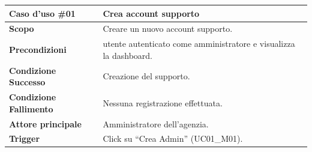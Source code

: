 \documentclass{article}
\begin{document}
\newpage
\begin{table}[htbp]
\centering
\renewcommand{\arraystretch}{1.5}
\begin{tabular}{|p{3cm}|l|p{4.5cm}|p{4.5cm}|}
\hline
\rowcolor[HTML]{010066} 
{\color[HTML]{EFEFEF} \textbf{Caso d'uso \#01}} & \multicolumn{3}{l|}{\color[HTML]{FFFFFF} \textbf{Crea account supporto}} \\ \hline

\textbf{Scopo} & \multicolumn{3}{l|}{Creare un nuovo account supporto.} \\ \hline

\textbf{Precondizioni} & \multicolumn{3}{l|}{utente autenticato come amministratore e visualizza la dashboard.} \\ \hline

\textbf{Condizione Successo} & \multicolumn{3}{l|}{Creazione del supporto.} \\ \hline

\textbf{Condizione Fallimento} & \multicolumn{3}{l|}{Nessuna registrazione effettuata.} \\ \hline

\textbf{Attore principale} & \multicolumn{3}{l|}{Amministratore dell'agenzia.} \\ \hline

\textbf{Trigger} & \multicolumn{3}{l|}{Click su ``Crea Admin'' (UC01\_M01).} \\ \hline


\end{tabular}
\end{table}
\end{document}
